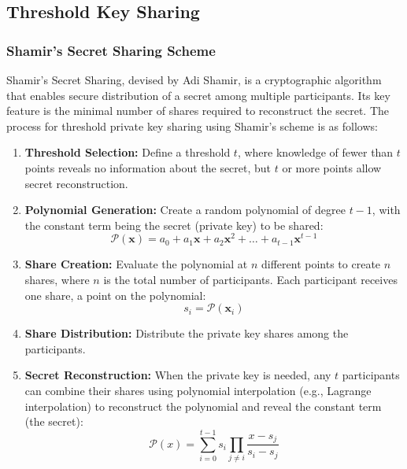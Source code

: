 \documentclass[11pt]{article}
\begin{document}
\subsection{Threshold Key Sharing}
\label{sec:key_sharing}

\subsubsection{Shamir's Secret Sharing Scheme}
\label{sec:shamir}

Shamir's Secret Sharing, devised by Adi Shamir, is a cryptographic algorithm that enables secure distribution of a secret among multiple participants. Its key feature is the minimal number of shares required to reconstruct the secret. The process for threshold private key sharing using Shamir's scheme is as follows:

\begin{enumerate}
    \item \textbf{Threshold Selection:} Define a threshold $t$, where knowledge of fewer than $t$ points reveals no information about the secret, but $t$ or more points allow secret reconstruction.
    
    \item \textbf{Polynomial Generation:} Create a random polynomial of degree $t-1$, with the constant term being the secret (private key) to be shared:
    \begin{equation}
        \mathcal{P}(\mathbf{x})=a_0+a_1\mathbf{x}+a_2\mathbf{x}^2+\ldots+a_{t-1}\mathbf{x}^{t-1}
    \end{equation}
    
    \item \textbf{Share Creation:} Evaluate the polynomial at $n$ different points to create $n$ shares, where $n$ is the total number of participants. Each participant receives one share, a point on the polynomial:
    \begin{equation}
        s_i=\mathcal{P}(\mathbf{x}_i)
    \end{equation}
    
    \item \textbf{Share Distribution:} Distribute the private key shares among the participants.
    
    \item \textbf{Secret Reconstruction:} When the private key is needed, any $t$ participants can combine their shares using polynomial interpolation (e.g., Lagrange interpolation) to reconstruct the polynomial and reveal the constant term (the secret):
    \begin{equation}
        \mathcal{P}(x)=\sum^{t-1}_{i=0}s_i\prod_{j\neq i}\frac{x-s_j}{s_i-s_j}
    \end{equation}
\end{enumerate}
\end{document}
